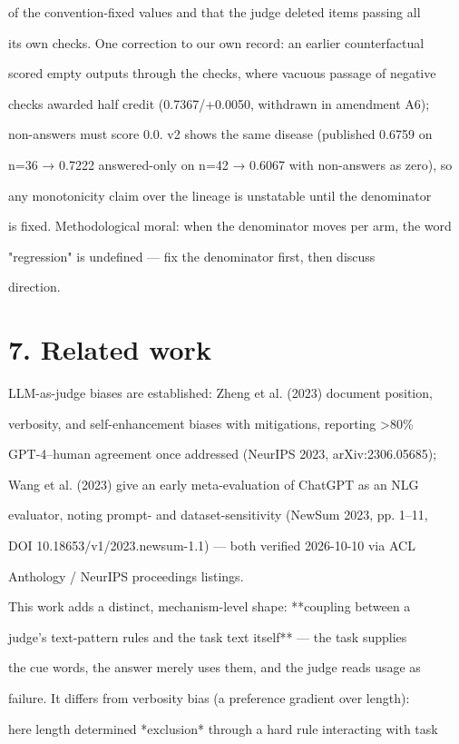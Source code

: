 \documentclass[11pt,a4paper]{article}
\begin{document}
of the convention-fixed values and that the judge deleted items passing all

its own checks. One correction to our own record: an earlier counterfactual

scored empty outputs through the checks, where vacuous passage of negative

checks awarded half credit (0.7367/+0.0050, withdrawn in amendment A6);

non-answers must score 0.0. v2 shows the same disease (published 0.6759 on

n=36 → 0.7222 answered-only on n=42 → 0.6067 with non-answers as zero), so

any monotonicity claim over the lineage is unstatable until the denominator

is fixed. Methodological moral: when the denominator moves per arm, the word

"regression" is undefined — fix the denominator first, then discuss

direction.

\section*{7. Related work}
LLM-as-judge biases are established: Zheng et al. (2023) document position,

verbosity, and self-enhancement biases with mitigations, reporting >80\%

GPT-4–human agreement once addressed (NeurIPS 2023, arXiv:2306.05685);

Wang et al. (2023) give an early meta-evaluation of ChatGPT as an NLG

evaluator, noting prompt- and dataset-sensitivity (NewSum 2023, pp. 1–11,

DOI 10.18653/v1/2023.newsum-1.1) — both verified 2026-10-10 via ACL

Anthology / NeurIPS proceedings listings.

This work adds a distinct, mechanism-level shape: **coupling between a

judge's text-pattern rules and the task text itself** — the task supplies

the cue words, the answer merely uses them, and the judge reads usage as

failure. It differs from verbosity bias (a preference gradient over length):

here length determined *exclusion* through a hard rule interacting with task
\end{document}
